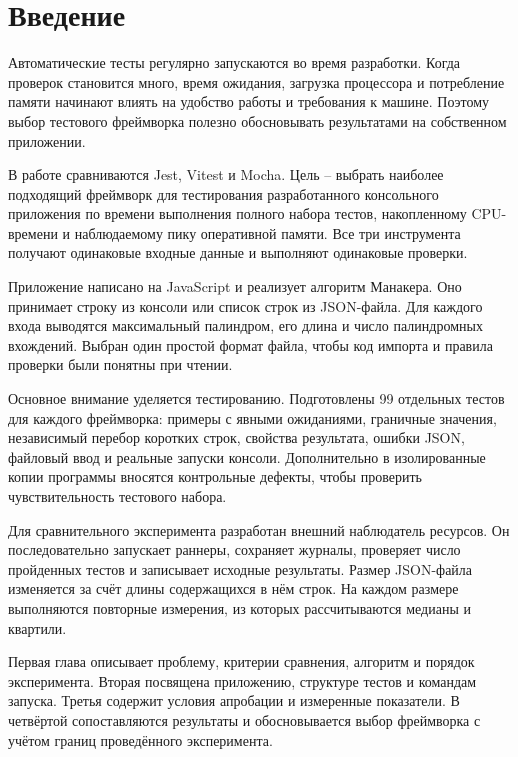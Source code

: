 \chapter*{Введение}\label{body-start}

Автоматические тесты регулярно запускаются во время разработки. Когда проверок становится много, время ожидания, загрузка процессора и потребление памяти начинают влиять на удобство работы и требования к машине. Поэтому выбор тестового фреймворка полезно обосновывать результатами на собственном приложении.

В работе сравниваются Jest, Vitest и Mocha. Цель -- выбрать наиболее подходящий фреймворк для тестирования разработанного консольного приложения по времени выполнения полного набора тестов, накопленному CPU-времени и наблюдаемому пику оперативной памяти. Все три инструмента получают одинаковые входные данные и выполняют одинаковые проверки.

Приложение написано на JavaScript и реализует алгоритм Манакера. Оно принимает строку из консоли или список строк из JSON-файла. Для каждого входа выводятся максимальный палиндром, его длина и число палиндромных вхождений. Выбран один простой формат файла, чтобы код импорта и правила проверки были понятны при чтении.

Основное внимание уделяется тестированию. Подготовлены 99 отдельных тестов для каждого фреймворка: примеры с явными ожиданиями, граничные значения, независимый перебор коротких строк, свойства результата, ошибки JSON, файловый ввод и реальные запуски консоли. Дополнительно в изолированные копии программы вносятся контрольные дефекты, чтобы проверить чувствительность тестового набора.

Для сравнительного эксперимента разработан внешний наблюдатель ресурсов. Он последовательно запускает раннеры, сохраняет журналы, проверяет число пройденных тестов и записывает исходные результаты. Размер JSON-файла изменяется за счёт длины содержащихся в нём строк. На каждом размере выполняются повторные измерения, из которых рассчитываются медианы и квартили.

Первая глава описывает проблему, критерии сравнения, алгоритм и порядок эксперимента. Вторая посвящена приложению, структуре тестов и командам запуска. Третья содержит условия апробации и измеренные показатели. В четвёртой сопоставляются результаты и обосновывается выбор фреймворка с учётом границ проведённого эксперимента.
